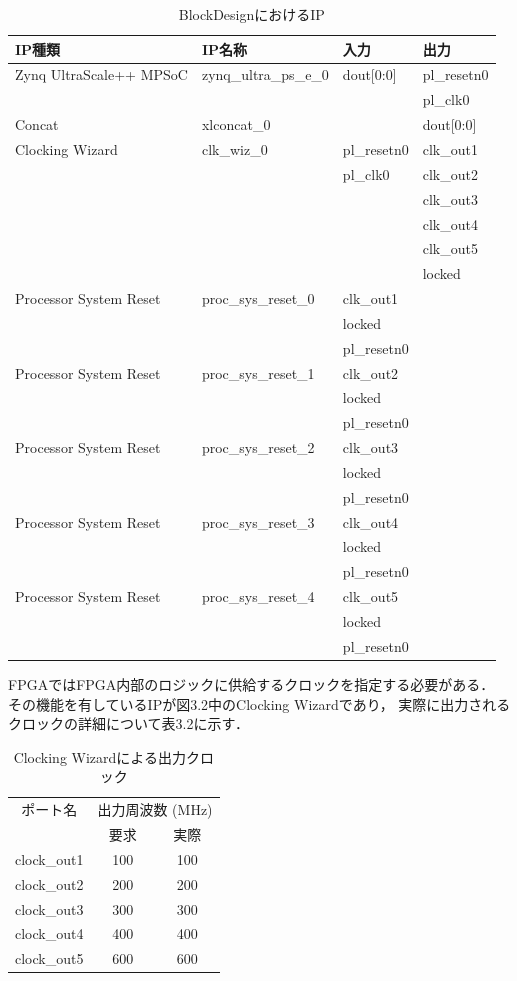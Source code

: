 \documentclass[11pt,a4j]{jreport}
\begin{document}
\begin{table}[H]
  \caption{BlockDesignにおけるIP}
  \label{table:SpeedOfLight}
  \centering
   \begin{tabular}{llll}
    \hline
    IP種類 & IP名称 & 入力 & 出力 \\
    \hline \hline
    Zynq UltraScale++ MPSoC & zynq_ultra_ps_e_0 & dout[0:0] & pl_resetn0 \\
    & & & pl_clk0 \\
    \hline
    Concat & xlconcat_0 & & dout[0:0] \\
    \hline
    Clocking Wizard & clk_wiz_0 & pl_resetn0 & clk_out1 \\
    & & pl_clk0 & clk_out2 \\
    & & & clk_out3 \\
    & & & clk_out4 \\
    & & & clk_out5 \\
    & & & locked \\
    \hline
    Processor System Reset & proc_sys_reset_0 & clk_out1 & \\
    & & locked & \\
    & & pl_resetn0 & \\
    \hline
    Processor System Reset & proc_sys_reset_1 & clk_out2 & \\
    & & locked & \\
    & & pl_resetn0 & \\
    \hline
    Processor System Reset & proc_sys_reset_2 & clk_out3 & \\
    & & locked & \\
    & & pl_resetn0 & \\
    \hline
    Processor System Reset & proc_sys_reset_3 & clk_out4 & \\
    & & locked & \\
    & & pl_resetn0 & \\
    \hline
    Processor System Reset & proc_sys_reset_4 & clk_out5 & \\
    & & locked & \\
    & & pl_resetn0 & \\
  \hline
  \end{tabular}
\end{table}
FPGAではFPGA内部のロジックに供給するクロックを指定する必要がある．
その機能を有しているIPが図3.2中のClocking Wizardであり，
実際に出力されるクロックの詳細について表3.2に示す．
\begin{table}[H]
  \caption{Clocking Wizardによる出力クロック}
  \label{physics}
  \centering
  \begin{tabular}{ccc}
    \hline
    ポート名 & \multicolumn{2}{c}{出力周波数 (MHz)} \\
    \cmidrule(lr){2-3}
     & 要求 & 実際 \\
    \hline
    clock_out1 & 100 & 100 \\
    clock_out2 & 200 & 200 \\
    clock_out3 & 300 & 300 \\
    clock_out4 & 400 & 400 \\
    clock_out5 & 600 & 600 \\
    \hline
    \end{tabular}
\end{table}
\end{document}
